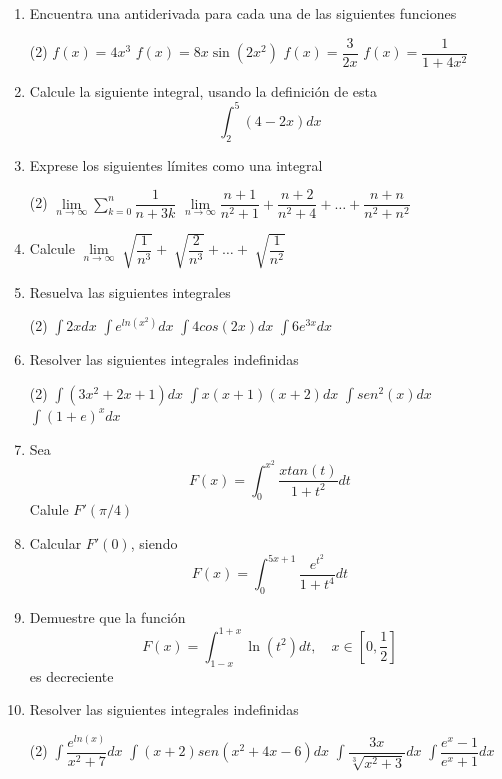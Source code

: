 \documentclass[12pt]{article}
\newenvironment{preguntas}
{\begin{enumerate}\itemsep12pt
	}
	{
	\end{enumerate}
}
\newcommand{\ra}{\rightarrow}
\begin{document}
\begin{preguntas}
\item Encuentra una antiderivada para cada una de las siguientes funciones
\begin{tasks}(2)
\task $f(x) = 4x^3$
\task $f(x) = 8x\sin (2x^2)$
\task $f(x) = \dfrac{3}{2x}$
\task $f(x) = \dfrac{1}{1+4x^2}$
\end{tasks}
\item Calcule la siguiente integral, usando la definición de esta
	$$\int_2^5(4-2x)dx$$
\item Exprese los siguientes límites como una integral
	
\begin{tasks}(2)
\task $\lim\limits_{n\ra \infty} \sum\limits_{k=0}^n \dfrac{1}{n+3k}$
\task $\lim\limits_{n \ra \infty} \dfrac{n+1}{n^2+1} + \dfrac{n+2}{n^2+4} + \dots  + \dfrac{n+n}{n^2+n^2}$
\end{tasks}
\item Calcule $\lim\limits_{n \ra \infty} \sqrt[]{\dfrac{1}{n^3}} + \sqrt[]{\dfrac{2}{n^3}} + \dots  + \sqrt[]{\dfrac{1}{n^2}}$
\item Resuelva las siguientes integrales
\begin{tasks}(2)
\task $\displaystyle\int 2xdx$
\task $\displaystyle\int e^{ln(x^2)}dx$
\task $\displaystyle\int 4cos(2x)dx$
\task $\displaystyle\int 6e^{3x}dx$
\end{tasks}
\item Resolver las siguientes integrales indefinidas
\begin{tasks}(2)
\task $\displaystyle\int (3x^2 + 2x + 1)dx$
\task $\displaystyle\int x(x+1)(x+2)dx$
\task $\displaystyle\int sen^2(x)dx$
\task $\displaystyle\int (1+e)^xdx$
\end{tasks}
\item Sea
$$F(x) = \displaystyle\int_0^{x^2} \dfrac{xtan(t)}{1+t^2}dt$$
	Calule $F'(\pi /4)$
\item Calcular $F'(0)$, siendo
	$$F(x) = \displaystyle\int_0^{5x+1} \dfrac{e^{t^2}}{1+t^4}dt$$
\item Demuestre que la función
$$F(x) = \displaystyle\int_{1-x}^{1+x} \ln(t^2)dt, \quad x \in [0, \frac{1}{2}]$$
es decreciente
\item Resolver las siguientes integrales indefinidas
\begin{tasks}(2)
\task $\displaystyle\int \dfrac{e^{ln(x)}}{x^2+7}dx$
\task $\displaystyle\int (x+2)sen(x^2+4x-6)dx$
\task $\displaystyle\int \dfrac{3x}{\sqrt[3]{x^2+3}}dx$
\task $\displaystyle\int \dfrac{e^x-1}{e^x+1}dx$
\end{tasks}

\end{preguntas}
\end{document}

